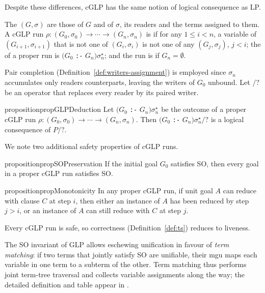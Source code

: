 Despite these differences, cGLP has the same notion of logical consequence as LP.

\begin{definition}
\label{def:cglp-proper-run}
The  $(G,\sigma)$ are those of $G$ and of $\sigma$, its readers and the terms assigned to them.  A cGLP run $\rho: (G_0,\sigma_0) \rightarrow \cdots \rightarrow (G_n, \sigma_n)$ is  if for any $1\le i< n$, a variable of $(G_{i+1},\sigma_{i+1})$ that is not one of $(G_i,\sigma_i)$ is not one of any $(G_j,\sigma_j)$, $j<i$; the  of a proper run is $(G_0$ \texttt{:-} $G_n)\sigma_n^\star$; and the run is  if $G_n=\emptyset$.
\end{definition}
Pair completion (Definition~\ref{def:writers-assignment}) is employed since $\sigma_n$ accumulates only readers counterparts, leaving the writers of $G_0$ unbound. Let $/?$ be an operator that replaces every reader by its paired writer.

\begin{restatable}{proposition}{propGLPDeduction}
\label{prop:cglp-deduction}
Let $(G_0$ \texttt{:-} $G_n)\sigma_n^\star$ be the outcome of a proper cGLP run $\rho: (G_0,\sigma_0) \rightarrow \cdots \rightarrow (G_n, \sigma_n)$. Then $(G_0$ \texttt{:-} $G_n)\sigma_n^\star/?$ is a logical consequence of $P/?$.
\end{restatable}

We note two additional safety properties of cGLP runs.

\begin{restatable}[SO Preservation]{proposition}{propSOPreservation}
\label{prop:so-preservation}
If the initial goal $G_0$ satisfies SO, then every goal in a proper cGLP run satisfies SO.
\end{restatable}

\begin{restatable}[Monotonicity]{proposition}{propMonotonicity}
\label{prop:glp-monotonicity}
In any proper cGLP run, if unit goal $A$ can reduce with clause $C$ at step $i$, then either an instance of $A$ has been reduced by step $j > i$, or an instance of $A$ can still reduce with $C$ at step $j$.
\end{restatable}

Every cGLP run is safe, so correctness (Definition~\ref{def:ts}) reduces to liveness.

The SO invariant of GLP allows eschewing unification in favour of \emph{term matching}: if two terms that jointly satisfy SO are unifiable, their mgu maps each variable in one term to a subterm of the other. Term matching thus performs joint term-tree traversal and collects variable assignments along the way; the detailed definition and table appear in .

